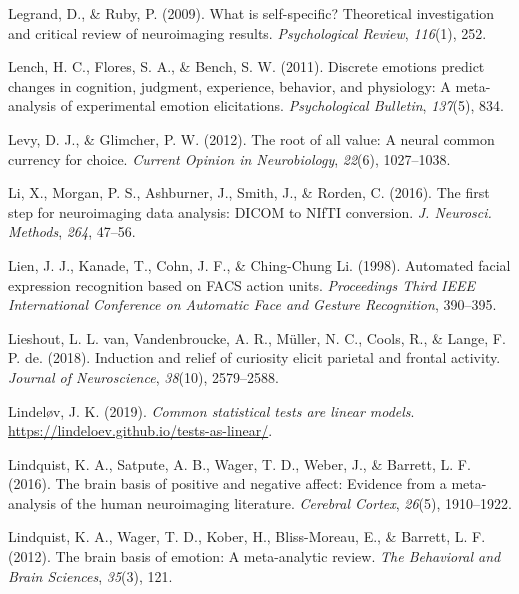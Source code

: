 \documentclass[12pt,american,a4paper,oneside,]{memoir} %
\begin{document}
\leavevmode\hypertarget{ref-legrand2009self}{}%
Legrand, D., \& Ruby, P. (2009). What is self-specific? Theoretical investigation and critical review of neuroimaging results. \emph{Psychological Review}, \emph{116}(1), 252.

\leavevmode\hypertarget{ref-lench2011discrete}{}%
Lench, H. C., Flores, S. A., \& Bench, S. W. (2011). Discrete emotions predict changes in cognition, judgment, experience, behavior, and physiology: A meta-analysis of experimental emotion elicitations. \emph{Psychological Bulletin}, \emph{137}(5), 834.

\leavevmode\hypertarget{ref-levy2012root}{}%
Levy, D. J., \& Glimcher, P. W. (2012). The root of all value: A neural common currency for choice. \emph{Current Opinion in Neurobiology}, \emph{22}(6), 1027--1038.

\leavevmode\hypertarget{ref-Li2016-ss}{}%
Li, X., Morgan, P. S., Ashburner, J., Smith, J., \& Rorden, C. (2016). The first step for neuroimaging data analysis: DICOM to NIfTI conversion. \emph{J. Neurosci. Methods}, \emph{264}, 47--56.

\leavevmode\hypertarget{ref-Lien1998-bg}{}%
Lien, J. J., Kanade, T., Cohn, J. F., \& Ching-Chung Li. (1998). Automated facial expression recognition based on FACS action units. \emph{Proceedings Third IEEE International Conference on Automatic Face and Gesture Recognition}, 390--395.

\leavevmode\hypertarget{ref-van2018induction}{}%
Lieshout, L. L. van, Vandenbroucke, A. R., Müller, N. C., Cools, R., \& Lange, F. P. de. (2018). Induction and relief of curiosity elicit parietal and frontal activity. \emph{Journal of Neuroscience}, \emph{38}(10), 2579--2588.

\leavevmode\hypertarget{ref-Lindelov2019-jk}{}%
Lindeløv, J. K. (2019). \emph{Common statistical tests are linear models}. \url{https://lindeloev.github.io/tests-as-linear/}.

\leavevmode\hypertarget{ref-lindquist2016brain}{}%
Lindquist, K. A., Satpute, A. B., Wager, T. D., Weber, J., \& Barrett, L. F. (2016). The brain basis of positive and negative affect: Evidence from a meta-analysis of the human neuroimaging literature. \emph{Cerebral Cortex}, \emph{26}(5), 1910--1922.

\leavevmode\hypertarget{ref-lindquist2012brain}{}%
Lindquist, K. A., Wager, T. D., Kober, H., Bliss-Moreau, E., \& Barrett, L. F. (2012). The brain basis of emotion: A meta-analytic review. \emph{The Behavioral and Brain Sciences}, \emph{35}(3), 121.
\end{document}
